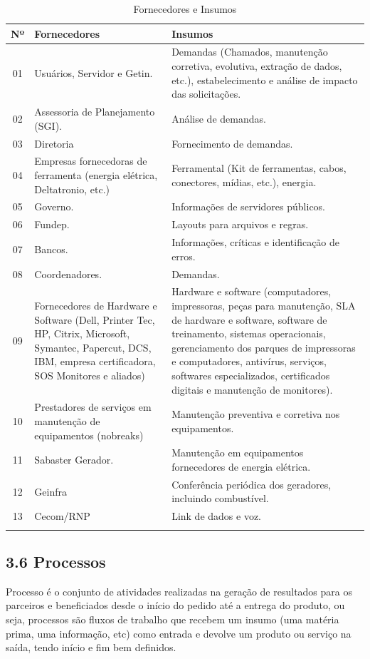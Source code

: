 \documentclass{article}
\begin{document}
\begin{longtable}{|c|p{4cm}|p{8cm}|}
\toprule
Nº & Fornecedores & Insumos \\
\midrule
01 & Usuários, Servidor e Getin. & Demandas (Chamados, manutenção corretiva, evolutiva, extração de dados, etc.), estabelecimento e análise de impacto das solicitações. \\
02 & Assessoria de Planejamento (SGI). & Análise de demandas. \\
03 & Diretoria & Fornecimento de demandas. \\
04 & Empresas fornecedoras de ferramenta (energia elétrica, Deltatronio, etc.) & Ferramental (Kit de ferramentas, cabos, conectores, mídias, etc.), energia. \\
05 & Governo. & Informações de servidores públicos. \\
06 & Fundep. & Layouts para arquivos e regras. \\
07 & Bancos. & Informações, críticas e identificação de erros. \\
08 & Coordenadores. & Demandas. \\
09 & Fornecedores de Hardware e Software (Dell, Printer Tec, HP, Citrix, Microsoft, Symantec, Papercut, DCS, IBM, empresa certificadora, SOS Monitores e aliados) & Hardware e software (computadores, impressoras, peças para manutenção, SLA de hardware e software, software de treinamento, sistemas operacionais, gerenciamento dos parques de impressoras e computadores, antivírus, serviços, softwares especializados, certificados digitais e manutenção de monitores). \\
10 & Prestadores de serviços em manutenção de equipamentos (nobreaks) & Manutenção preventiva e corretiva nos equipamentos. \\
11 & Sabaster Gerador. & Manutenção em equipamentos fornecedores de energia elétrica. \\
12 & Geinfra & Conferência periódica dos geradores, incluindo combustível. \\
13 & Cecom/RNP & Link de dados e voz. \\
\bottomrule
\caption{Fornecedores e Insumos}
\label{tab:fornecedores_insumos}
\end{longtable}

\subsection*{3.6 Processos}

Processo é o conjunto de atividades realizadas na geração de resultados para os parceiros e beneficiados desde o início do pedido até a entrega do produto, ou seja, processos são fluxos de trabalho que recebem um insumo (uma matéria prima, uma informação, etc) como entrada e devolve um produto ou serviço na saída, tendo início e fim bem definidos.
\end{document}
